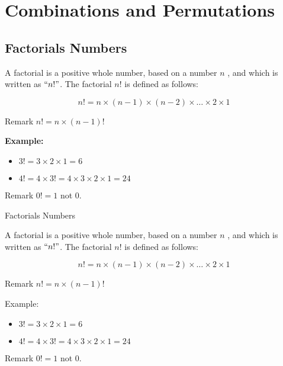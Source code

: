 	
	\section{ Combinations and Permutations }
	
	{
		\subsection{Factorials Numbers}
		
		A factorial is a positive whole number, based on a number $n$ , and which is written as $``n!"$. The factorial $n!$ is defined as follows:
		
		\[n!  =n \times (n-1) \times (n-2) \times \ldots \times 2 \times 1 \]
		
		Remark $n!  =n \times (n-1)!$\\ \bigskip
		
		\textbf{ Example: }
		
		\begin{itemize}
			\item $3!  = 3 \times 2  \times 1 = 6 $
			
			\item $4!  = 4 \times 3! = 4 \times 3 \times 2 \times 1 = 24$
		\end{itemize}
		Remark $0! = 1$ not $0$.
	}	
	{
		{Factorials Numbers}
		
		A factorial is a positive whole number, based on a number $n$ , and which is written as $``n!"$. The factorial $n!$ is defined as follows:
		
		\[n!  =n \times (n-1) \times (n-2) \times \ldots \times 2 \times 1 \]
		
		Remark $n!  =n \times (n-1)!$\\ \bigskip
		
		\t{ Example: }
		
		\begin{itemize}
			\item $3!  = 3 \times 2  \times 1 = 6 $
			
			\item $4!  = 4 \times 3! = 4 \times 3 \times 2 \times 1 = 24$
		\end{itemize}
		Remark $0! = 1$ not $0$.
		
		
	}
